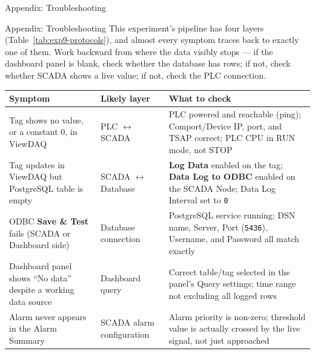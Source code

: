 \begin{labsection}{Appendix: Troubleshooting}{}
  \begin{labsection}{Appendix: Troubleshooting}{}
    This experiment's pipeline has four layers (Table~\ref{tab:exp9-protocols}), and almost every symptom traces back to exactly one of them. Work backward from where the data visibly stops --- if the dashboard panel is blank, check whether the database has rows; if not, check whether SCADA shows a live value; if not, check the PLC connection.
    \vspace*{0.5em}

    \needspace{6cm}
    \begin{boxedtable}
      \label{tab:exp9-troubleshooting}
      \centering
      {\renewcommand{\arraystretch}{1.3}
        \begin{tabular}{p{4.2cm}p{4.2cm}p{5.5cm}}
          \toprule
          Symptom                                                         & Likely layer                     & What to check                                                                                                                  \\
          \midrule
          Tag shows no value, or a constant 0, in ViewDAQ                 & PLC $\leftrightarrow$ SCADA      & PLC powered and reachable (ping); Comport/Device IP, port, and TSAP correct; PLC CPU in RUN mode, not STOP                     \\
          Tag updates in ViewDAQ but PostgreSQL table is empty            & SCADA $\leftrightarrow$ Database & \textbf{Log Data} enabled on the tag; \textbf{Data Log to ODBC} enabled on the SCADA Node; Data Log Interval set to \texttt{0} \\
          ODBC \textbf{Save \& Test} fails (SCADA or Dashboard side)      & Database connection              & PostgreSQL service running; DSN name, Server, Port (\texttt{5436}), Username, and Password all match exactly                   \\
          Dashboard panel shows ``No data'' despite a working data source & Dashboard query                  & Correct table/tag selected in the panel's Query settings; time range not excluding all logged rows                             \\
          Alarm never appears in the Alarm Summary                        & SCADA alarm configuration        & Alarm priority is non-zero; threshold value is actually crossed by the live signal, not just approached                        \\
          \bottomrule
        \end{tabular}
      }
    \end{boxedtable}


\end{labsection}
\end{labsection}
